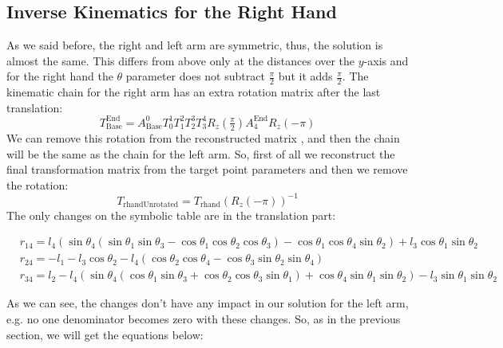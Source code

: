 \subsection{Inverse Kinematics for the Right Hand}
As we said before, the right and left arm are symmetric, thus, the solution is almost the same. This differs from above only at the distances over the $y$-axis and for the right hand the $\theta$ parameter does not subtract $\frac{\pi}{2}$ but it adds $\frac{\pi}{2}$. The kinematic chain for the right arm has an extra rotation matrix after the last translation:
\[
T^\text{End}_\text{Base} = A^0_\text{Base}T^1_0T^2_1T^3_2T^4_3R_z(\tfrac{\pi}{2})A^\text{End}_{4}R_z(-\pi)
\]
We can remove this rotation from the reconstructed matrix , and then the chain will be the same as the chain for the left arm. So, first of all we reconstruct the final transformation matrix from the target point parameters and then we remove the rotation:
\[
T_\text{rhandUnrotated} = T_\text{rhand}{\left(R_z(-\pi)\right)}^{-1}
\]
The only changes on the symbolic table are in the translation part:
\begin{small}
\begin{align*}
&r_{14} = l_4\left(\sin\theta_4\left(\sin\theta_1\sin\theta_3 - \cos\theta_1\cos\theta_2\cos\theta_3\right) - \cos\theta_1\cos\theta_4\sin\theta_2\right) + l_3\cos\theta_1\sin\theta_2\\
&r_{24} = -l_1 - l_3\cos\theta_2 - l_4\left(\cos\theta_2\cos\theta_4 - \cos\theta_3\sin\theta_2\sin\theta_4\right)\\
&r_{34} = l_2 - l_4\left(\sin\theta_4\left(\cos\theta_1\sin\theta_3 + \cos\theta_2\cos\theta_3\sin\theta_1\right) + \cos\theta_4\sin\theta_1\sin\theta_2\right) - l_3\sin\theta_1\sin\theta_2
\end{align*}
\end{small}
As we can see, the changes don't have any impact in our solution for the left arm, e.g. no one denominator becomes zero with these changes. So, as in the previous section, we will get the equations below:
